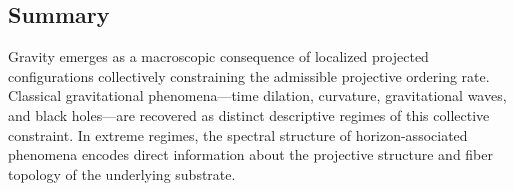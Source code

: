 \subsection{Summary}
  \label{subsec:summary-gravity}

  Gravity emerges as a macroscopic consequence of localized projected
  configurations collectively constraining the admissible projective ordering rate.
  Classical gravitational phenomena---time dilation, curvature,
  gravitational waves, and black holes---are recovered as distinct
  descriptive regimes of this collective constraint.
  In extreme regimes, the spectral structure of horizon-associated phenomena
  encodes direct information about the projective structure and fiber
  topology of the underlying substrate.

